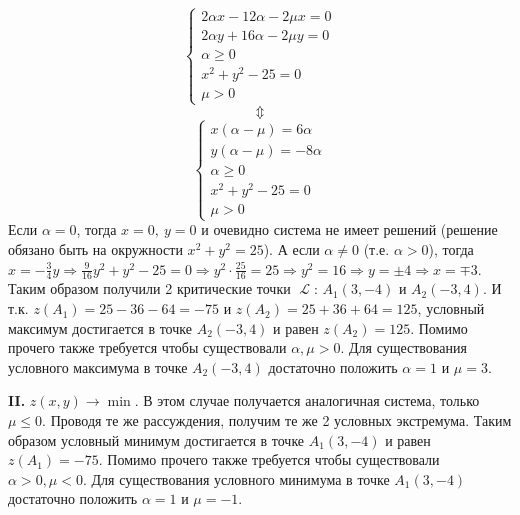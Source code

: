 \documentclass{article}
\DeclareMathOperator{\lagr}{\mathcal{L}}
\begin{document}
\begin{equation*}
 \begin{cases}
   2\alpha x - 12\alpha-2\mu x = 0\\
   2\alpha y + 16\alpha-2\mu y = 0\\
   \alpha \geq 0\\
   x^2+y^2-25 = 0\\
   \mu > 0
 \end{cases}
\end{equation*}
$$\Updownarrow$$
\begin{equation*}
 \begin{cases}
   x(\alpha -\mu) = 6\alpha\\
   y(\alpha -\mu) = -8\alpha\\
   \alpha \geq 0\\
   x^2+y^2-25 = 0\\
   \mu > 0
 \end{cases}
\end{equation*}
Если $\alpha=0$, тогда $x=0,\ y=0$ и очевидно система не имеет решений (решение обязано быть на окружности $x^2+y^2=25$). А если $\alpha \neq 0$ (т.е. $\alpha > 0$), тогда $x = -\frac{3}{4}y \Rightarrow \frac{9}{16}y^2+y^2-25=0\Rightarrow y^2\cdot\frac{25}{16}=25\Rightarrow y^2=16\Rightarrow y = \pm 4\Rightarrow x = \mp 3$. Таким образом получили 2 критические точки $\lagr$: $A_1(3,-4)$ и $A_2(-3, 4)$. И т.к. $z(A_1)=25-36-64=-75$ и $z(A_2)=25+36+64=125$, условный максимум достигается в точке $A_2(-3,4)$ и равен $z(A_2)=125$. Помимо прочего также требуется чтобы существовали $\alpha,\mu > 0$. Для существования условного максимума в точке $A_2(-3,4)$ достаточно положить $\alpha=1$ и $\mu=3$.
\par
{\bf II.} $z(x,y) \to \min$. В этом случае получается аналогичная система, только $\mu \leq 0$. Проводя те же рассуждения, получим те же 2 условных экстремума. Таким образом условный минимум достигается в точке $A_1(3,-4)$ и равен $z(A_1)=-75$. Помимо прочего также требуется чтобы существовали $\alpha > 0,\mu < 0$. Для существования условного минимума в точке $A_1(3,-4)$ достаточно положить $\alpha=1$ и $\mu=-1$.
\end{document}
